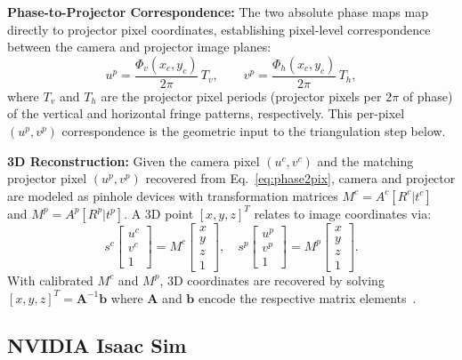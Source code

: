 \documentclass[journal,twoside,web]{ieeecolor}
\begin{document}
\textbf{Phase-to-Projector Correspondence:} The two absolute phase maps map directly to projector pixel coordinates, establishing pixel-level correspondence between the camera and projector image planes:
\begin{equation}\label{eq:phase2pix}
u^p = \frac{\Phi_v(x_c, y_c)}{2\pi}\, T_v, \qquad
v^p = \frac{\Phi_h(x_c, y_c)}{2\pi}\, T_h,
\end{equation}
where $T_v$ and $T_h$ are the projector pixel periods (projector pixels per $2\pi$ of phase) of the vertical and horizontal fringe patterns, respectively. This per-pixel $(u^p, v^p)$ correspondence is the geometric input to the triangulation step below.

\textbf{3D Reconstruction:} Given the camera pixel $(u^c, v^c)$ and the matching projector pixel $(u^p, v^p)$ recovered from Eq.~\ref{eq:phase2pix}, camera and projector are modeled as pinhole devices with
transformation matrices $M^c = A^c[R^c|t^c]$ and $M^p = A^p[R^p|t^p]$.
A 3D point $[x,y,z]^T$ relates to image coordinates via:
\begin{equation}
    s^c \!\begin{bmatrix} u^c \\ v^c \\ 1 \end{bmatrix} = M^c \!\begin{bmatrix} x \\ y \\ z \\ 1 \end{bmatrix}, \quad
    s^p \!\begin{bmatrix} u^p \\ v^p \\ 1 \end{bmatrix} = M^p \!\begin{bmatrix} x \\ y \\ z \\ 1 \end{bmatrix}.
\end{equation}
With calibrated $M^c$ and $M^p$, 3D coordinates are recovered by solving
$[x,y,z]^T = \mathbf{A}^{-1}\mathbf{b}$ where $\mathbf{A}$ and $\mathbf{b}$ encode the
respective matrix elements~\cite{zhang2010recent}.

\subsection{NVIDIA Isaac Sim} \label{isaac}
\end{document}
